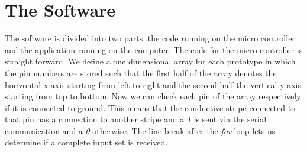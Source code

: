 \section{The Software}

The software is divided into two parts, the code running on the micro controller and the application running on the computer. The code for the micro controller is straight forward. We define a one dimensional array for each prototype in which the pin numbers are stored such that the first half of the array denotes the horizontal x-axis starting from left to right and the second half the vertical y-axis starting from top to bottom. Now we can check each pin of the array respectively if it is connected to ground. This means that the conductive stripe connected to that pin has a connection to another stripe and a \emph{1} is sent via the serial communication and a \emph{0} otherwise. The line break after the \emph{for} loop lets us determine if a complete input set is received.

